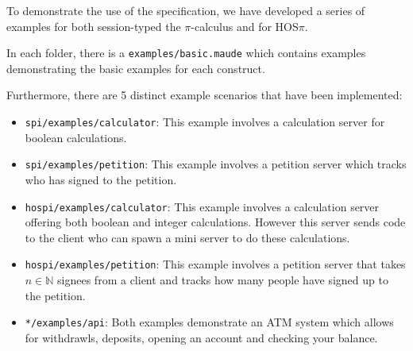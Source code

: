 



To demonstrate the use of the specification, we have developed a series of examples for both session-typed the $\pi$-calculus and for HOS$\pi$.

In each folder, there is a \texttt{examples/basic.maude} which contains examples demonstrating the basic examples for each construct.

Furthermore, there are 5 distinct example scenarios that have been implemented:
\begin{itemize}
    \item \texttt{spi/examples/calculator}: This example involves a calculation server for boolean calculations.
    \item \texttt{spi/examples/petition}: This example involves a petition server which tracks who has signed to the petition. 
    \item \texttt{hospi/examples/calculator}: This example involves a calculation server offering both boolean and integer calculations. However this server sends code to the client who can spawn a mini server to do these calculations.
    \item \texttt{hospi/examples/petition}: This example involves a petition server that takes $n \in \mathbb{N}$ signees from a client and tracks how many people have signed up to the petition.
    \item \texttt{*/examples/api}: Both examples demonstrate an ATM system which allows for withdrawls, deposits, opening an account and checking your balance.
\end{itemize}

